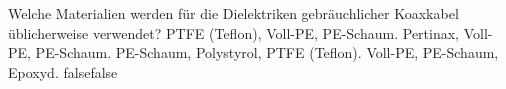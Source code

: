     {Welche Materialien werden für die Dielektriken gebräuchlicher Koaxkabel üblicherweise verwendet?}
    {PTFE (Teflon), Voll-PE, PE-Schaum.}
    {Pertinax, Voll-PE, PE-Schaum.}
    {PE-Schaum, Polystyrol, PTFE (Teflon).}
    {Voll-PE, PE-Schaum, Epoxyd.}
    {false}{false}